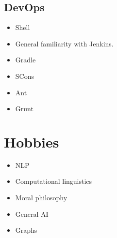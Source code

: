 \documentclass[11pt]{article}
\begin{document}
\subsection{DevOps}
\label{sec-4-8}
\begin{itemize}
\item Shell
\item General familiarity with Jenkins.
\item Gradle
\item SCons
\item Ant
\item Grunt
\end{itemize}
\section{Hobbies}
\label{sec-5}
\begin{itemize}
\item NLP
\item Computational linguistics
\item Moral philosophy
\item General AI
\item Graphs
\end{itemize}
\end{document}
